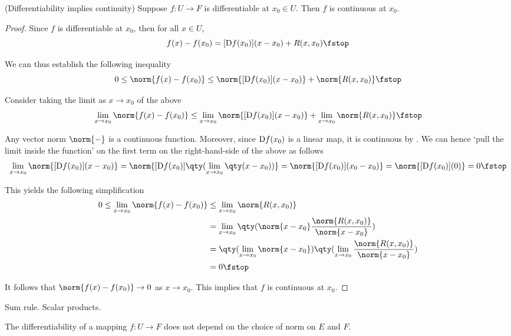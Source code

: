 \begin{theorem}
  (Differentiability implies continuity) Suppose \( f:U\to F \) is differentiable at \( x_0\in U \). Then \( f \) is continuous at \( x_0 \).
\end{theorem}
\begin{proof}
  Since \( f \) is differentiable at \( x_0 \), then for all \( x\in U \),
  \[ f(x)-f(x_0)=[\D f(x_0)](x-x_0)+R(x,x_0)\fstop \]

  We can thus establish the following inequality
  \[ 0\leq\norm{f(x)-f(x_0)}\leq\norm{[\D f(x_0)](x-x_0)}+\norm{R(x,x_0)}\fstop \]

  Consider taking the limit as \( x\to x_0 \) of the above
  \begin{equation*}
    \lim_{x\to x_0}\norm{f(x)-f(x_0)}\leq \lim_{x\to x_0}\norm{[\D f(x_0)](x-x_0)}+\lim_{x\to x_0}\norm{R(x,x_0)}\fstop
  \end{equation*}

  Any vector norm \( \norm{-} \) is a continuous function. Moreover, since \( \text{D} f(x_0) \) is a linear map, it is continuous by . We can hence `pull the limit inside the function' on the first term on the right-hand-side of the above as follows
  \[ \lim_{x\to x_0}\norm{[\D f(x_0)](x-x_0)}=\norm{[\D f(x_0)]\qty(\lim_{x\to x_0}\qty(x-x_0))}=\norm{[\D f(x_0)](x_0-x_0)}=\norm{[\D f(x_0)](0)}=0\fstop \]

  This yields the following simplification
  \begin{align*}
    0\leq \lim_{x\to x_0}\norm{f(x)-f(x_0)}&\leq \lim_{x\to x_0}\norm{R(x,x_0)}\\
    &= \lim_{x\to x_0}\qty(\norm{x-x_0}\frac{\norm{R(x,x_0)}}{\norm{x-x_0}})\\
    &= \qty(\lim_{x\to x_0}\norm{x-x_0})\qty(\lim_{x\to x_0}\frac{\norm{R(x,x_0)}}{\norm{x-x_0}})\\
    &= 0\fstop
  \end{align*}

  It follows that \( \norm{f(x)-f(x_0)}\to 0 \) as \( x\to x_0 \). This implies that \( f \) is continuous at \( x_0\).
\end{proof}

Sum rule. Scalar products.

\begin{theorem}
  The differentiability of a mapping \( f:U\to F \) does not depend on the choice of norm on \( E \) and \( F \).
\end{theorem}

